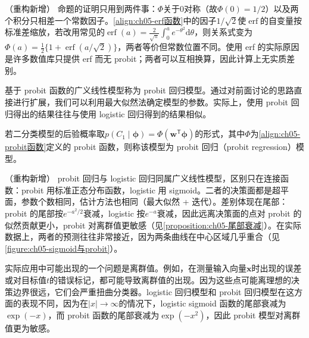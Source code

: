 \documentclass[../../main.tex]{subfiles}
\begin{document}
\begin{remark}（重构新增）
命题的证明只用到两件事：$\Phi$关于0对称（故$\Phi(0)=1/2$）以及两个积分只相差一个常数因子。\eqref{align:ch05-erf函数}中的因子$1/\sqrt{2}$使$\operatorname{erf}$的自变量按标准差缩放，若改用常见的$\operatorname{erf}(a)=\frac{2}{\sqrt{\pi}}\int_0^{a}e^{-\theta^{2}}\mathrm{d}\theta$，则关系式变为$\Phi(a)=\frac12\{1+\operatorname{erf}(a/\sqrt2)\}$，两者等价但常数位置不同。使用 erf 的实际原因是许多数值库只提供 erf 而无 probit；两者可以互相换算，因此计算上无实质差别。
\end{remark}

基于 probit 函数的广义线性模型称为 probit 回归模型。通过对前面讨论的思路直接进行扩展，我们可以利用最大似然法确定模型的参数。实际上，使用 probit 回归得出的结果往往与使用 logistic 回归得到的结果相似。

\begin{definition}[probit 回归]\label{definition:ch05-probit回归}
若二分类模型的后验概率取$p(C_1\mid\boldsymbol{\phi})=\Phi(\boldsymbol{w}^{\mathsf{T}}\boldsymbol{\phi})$的形式，其中$\Phi$为\eqref{align:ch05-probit函数}定义的 probit 函数，则称该模型为 probit 回归（probit regression）模型。
\end{definition}

\begin{remark}（重构新增）
probit 回归与 logistic 回归同属广义线性模型，区别只在连接函数：probit 用标准正态分布函数，logistic 用 sigmoid。二者的决策面都是超平面，参数个数相同，估计方法也相同（最大似然 + 迭代）。差别体现在尾部：probit 的尾部按$e^{-a^{2}/2}$衰减，logistic 按$e^{-a}$衰减，因此远离决策面的点对 probit 的似然贡献更小，probit 对离群值更敏感（见\cref{proposition:ch05-尾部衰减}）。在实际数据上，两者的预测往往非常接近，因为两条曲线在中心区域几乎重合（见\cref{figure:ch05-sigmoid与probit}）。
\end{remark}

实际应用中可能出现的一个问题是离群值。例如，在测量输入向量$\boldsymbol{x}$时出现的误差或对目标值$t$的错误标记，都可能导致离群值的出现。因为这些点可能离理想的决策边界很远，它们会严重扭曲分类器。logistic 回归模型和 probit 回归模型在这方面的表现不同，因为在$|x|\to\infty$的情况下，logistic sigmoid 函数的尾部衰减为$\exp(-x)$，而 probit 函数的尾部衰减为$\exp(-x^{2})$，因此 probit 模型对离群值更为敏感。
\end{document}
